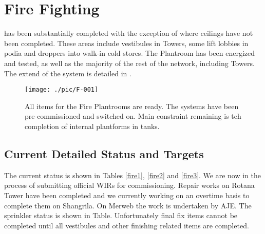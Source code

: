 
\chapter{Fire Fighting}


 has been substantially
completed with the exception of where ceilings have not been completed. These areas include vestibules in Towers, some lift lobbies in podia and droppers into walk-in cold stores. The
Plantroom has been energized and tested, as well as the majority of the rest of the network, including Towers. The extend of the system is detailed in .

\begin{figure*}
\texttt{[image: ./pic/F-001]}
\caption{All items for the Fire Plantrooms are ready. The systems have been pre-commissioned and
switched on. Main constraint remaining is teh completion of internal plantforms in tanks.}
\end{figure*}
 

\section{Current Detailed Status and Targets}

The current status is shown in Tables \ref{fire1}, \ref{fire2} and \ref{fire3}. We are now in the process of submitting official WIRs for commissioning. Repair works on Rotana Tower have been completed and we currently working on an overtime basis to complete them on Shangrila. On Merweb the work is undertaken by AJE. The sprinkler status is shown in Table. Unfortunately final fix items cannot be completed until all vestibules and other finishing related items are completed.

